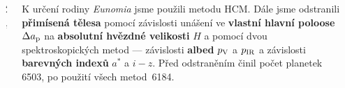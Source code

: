 \documentclass{beamer}
\newlength{\sep}
\newlength{\vyska}
\newlength{\vyskaA}
\newlength{\vyskaB}
\newlength{\side}
\newlength{\main}
\begin{document}
\begin{frame}
\begin{columns}[t]
\begin{column}{\side}
\begin{tcolorbox}[title=Metody nebeské mechaniky\phantom{Úy},height=0.665\vyskaA]
	\end{tcolorbox}

\vspace{\sep}

\end{column}

\begin{column}{2\sep}
\end{column}

\begin{column}{\main}
\begin{tcolorbox}[title=Určení členů rodiny Eunomia\phantom{Úy},height=0.25\vyskaB]

	K určení rodiny \textit{Eunomia} jsme použili metodu HCM. Dále jsme odstranili \textbf{přimísená tělesa} pomocí závislosti unášení ve \textbf{vlastní hlavní poloose} $\Delta a_{\rm p}$ na \textbf{absolutní hvězdné velikosti} $H$ a pomocí dvou spektroskopických metod --- závislosti \textbf{albed} $p_{\rm V}$ a $p_{\rm IR}$ a závislosti \textbf{barevných indexů} $a^*$ a $i-z$. Před odstraněním činil počet planetek 6503, po použití všech metod~6184.

	\vspace{-1.7cm}


\end{tcolorbox}
\end{column}
\end{columns}
\end{frame}
\end{document}
